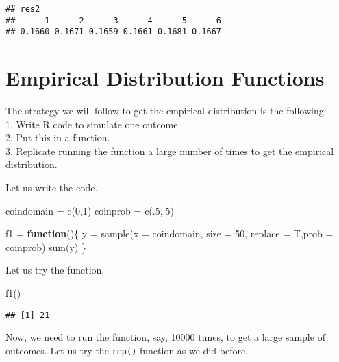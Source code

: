 \documentclass[
]{article}
\newenvironment{Shaded}{\begin{snugshade}}{\end{snugshade}}
\newcommand{\AttributeTok}[1]{\textcolor[rgb]{0.77,0.63,0.00}{#1}}
\newcommand{\ControlFlowTok}[1]{\textcolor[rgb]{0.13,0.29,0.53}{\textbf{#1}}}
\newcommand{\DecValTok}[1]{\textcolor[rgb]{0.00,0.00,0.81}{#1}}
\newcommand{\FunctionTok}[1]{\textcolor[rgb]{0.00,0.00,0.00}{#1}}
\newcommand{\NormalTok}[1]{#1}
\newcommand{\OtherTok}[1]{\textcolor[rgb]{0.56,0.35,0.01}{#1}}
\begin{document}
\begin{verbatim}
## res2
##      1      2      3      4      5      6 
## 0.1660 0.1671 0.1659 0.1661 0.1681 0.1667
\end{verbatim}

\hypertarget{empirical-distribution-functions}{%
\section{Empirical Distribution
Functions}\label{empirical-distribution-functions}}

The strategy we will follow to get the empirical distribution is the
following:\\
1. Write R code to simulate one outcome.\\
2. Put this in a function.\\
3. Replicate running the function a large number of times to get the
empirical distribution.

Let us write the code.

\begin{Shaded}
\begin{Highlighting}[]
\NormalTok{coindomain }\OtherTok{=} \FunctionTok{c}\NormalTok{(}\DecValTok{0}\NormalTok{,}\DecValTok{1}\NormalTok{)}
\NormalTok{coinprob }\OtherTok{=} \FunctionTok{c}\NormalTok{(.}\DecValTok{5}\NormalTok{,.}\DecValTok{5}\NormalTok{)}

\NormalTok{f1 }\OtherTok{=} \ControlFlowTok{function}\NormalTok{()\{}
\NormalTok{  y }\OtherTok{=} \FunctionTok{sample}\NormalTok{(}\AttributeTok{x =}\NormalTok{ coindomain, }\AttributeTok{size =} \DecValTok{50}\NormalTok{, }\AttributeTok{replace =}\NormalTok{ T,}\AttributeTok{prob =}\NormalTok{ coinprob)}
\FunctionTok{sum}\NormalTok{(y)}
\NormalTok{\}}
\end{Highlighting}
\end{Shaded}

Let us try the function.

\begin{Shaded}
\begin{Highlighting}[]
\FunctionTok{f1}\NormalTok{()}
\end{Highlighting}
\end{Shaded}

\begin{verbatim}
## [1] 21
\end{verbatim}

Now, we need to run the function, say, 10000 times, to get a large
sample of outcomes. Let us try the \texttt{rep()} function as we did
before.
\end{document}
